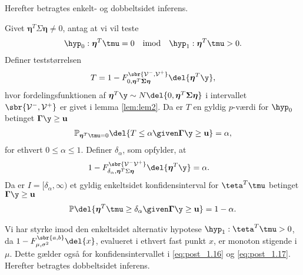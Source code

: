 Herefter betragtes enkelt- og dobbeltsidet inferens.
%
\begin{lem} \label{lem:lem3}
Givet \(\boldsymbol{\eta}^T \Sigma \boldsymbol{\eta} \neq 0\), antag at vi vil teste
\begin{align*}
\hyp_0: \boldsymbol{\eta}^T \tmu=0 \quad \text{imod} \quad \hyp_1: \boldsymbol{\eta}^T \tmu > 0.
\end{align*}
Definer teststørrelsen
\begin{align}
T=1- F_{0, \boldsymbol{\eta}^T \boldsymbol{\Sigma} \boldsymbol{\eta}}^{\sbr{\mathcal{V}^-, \mathcal{V}^+}} \del{\boldsymbol{\eta}^T \y}, \label{eq:post_1.14}
\end{align}
hvor fordelingsfunktionen af \(\boldsymbol{\eta}^T \y \sim N \del{0,  \boldsymbol{\eta}^T \boldsymbol{\Sigma} \boldsymbol{\eta}}\) i intervallet \(\sbr{\mathcal{V}^-, \mathcal{V}^+}\) er givet i lemma \ref{lem:lem2}.
Da er \(T\) en gyldig \(p\)-værdi for \(\hyp_0\) betinget \(\boldsymbol{\Gamma} \y \geq \mathbf{u}\)
\begin{align}
\mathbb{P}_{\boldsymbol{\eta}^T \tmu=0} \del{T \leq \alpha \given \boldsymbol{\Gamma }\y \geq \mathbf{u}} = \alpha, \label{eq:post_1.15}
\end{align}
for ethvert \(0 \leq \alpha \leq 1\). 
Definer \(\delta_{\alpha}\), som opfylder, at
\begin{align}
1-F_{\delta_{\alpha}, \boldsymbol{\eta}^T \Sigma \boldsymbol{\eta}}^{\sbr{\mathcal{V}^- \mathcal{V}^+}} \del{\boldsymbol{\eta}^T \y} &= \alpha. \label{eq:post_1.16}
\end{align}
Da er \(I= [\delta_\alpha, \infty )\) et gyldig enkeltsidet konfidensinterval for \(\teta^T \tmu\) betinget \(\boldsymbol{\Gamma} \y \geq \mathbf{u}\)
\begin{align}
\mathbb{P} \del{\boldsymbol{\eta}^T \tmu \geq \delta_\alpha \given \boldsymbol{\Gamma} \y \geq \mathbf{u}} = 1- \alpha. \label{eq:post_1.17}
\end{align}
\end{lem}
%
Vi har styrke imod den enkeltsidet alternativ hypotese \(\hyp_1 : \teta^T \tmu > 0\), da \(1-F_{\mu, \sigma^2}^{\sbr{a,b}} \del{x}\), evalueret i ethvert fast punkt \(x\), er monoton stigende i \(\mu\).
Dette gælder også for konfidensintervallet i \eqref{eq:post_1.16} og \eqref{eq:post_1.17}.
Herefter betragtes dobbeltsidet inferens.
%
